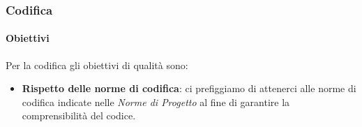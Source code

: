 			
		\subsubsection{Codifica}
			\paragraph{Obiettivi}
			Per la codifica gli obiettivi di qualità sono:
			\begin{itemize}
				\item \textbf{Rispetto delle norme di codifica}: ci prefiggiamo di attenerci alle norme di codifica indicate nelle \textit{Norme di Progetto} al fine di garantire la comprensibilità del codice.
			\end{itemize}	 
